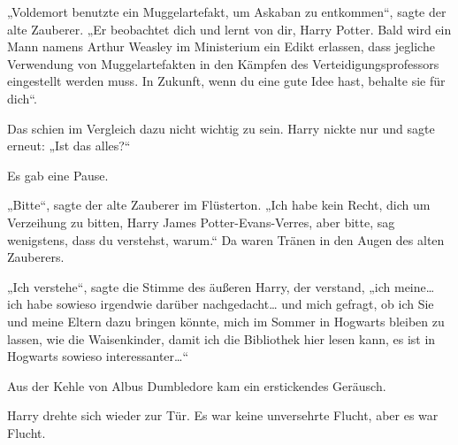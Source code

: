 „Voldemort benutzte ein Muggelartefakt, um Askaban zu entkommen“, sagte der alte Zauberer. „Er beobachtet dich und lernt von dir, Harry Potter. Bald wird ein Mann namens Arthur Weasley im Ministerium ein Edikt erlassen, dass jegliche Verwendung von Muggelartefakten in den Kämpfen des Verteidigungsprofessors eingestellt werden muss. In Zukunft, wenn du eine gute Idee hast, behalte sie für dich“.

Das schien im Vergleich dazu nicht wichtig zu sein. Harry nickte nur und sagte erneut: „Ist das alles?“

Es gab eine Pause.

„Bitte“, sagte der alte Zauberer im Flüsterton. „Ich habe kein Recht, dich um Verzeihung zu bitten, Harry James Potter-Evans-Verres, aber bitte, sag wenigstens, dass du verstehst, warum.“ Da waren Tränen in den Augen des alten Zauberers.

„Ich verstehe“, sagte die Stimme des äußeren Harry, der verstand, „ich meine… ich habe sowieso irgendwie darüber nachgedacht… und mich gefragt, ob ich Sie und meine Eltern dazu bringen könnte, mich im Sommer in Hogwarts bleiben zu lassen, wie die Waisenkinder, damit ich die Bibliothek hier lesen kann, es ist in Hogwarts sowieso interessanter…“

Aus der Kehle von Albus Dumbledore kam ein erstickendes Geräusch.

Harry drehte sich wieder zur Tür. Es war keine unversehrte Flucht, aber es war Flucht.

